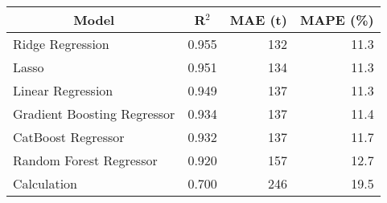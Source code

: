 
\begin{tabular}[t]{lrrr}
\toprule
\multicolumn{1}{c}{Model} & \multicolumn{1}{c}{R$^2$} & \multicolumn{1}{c}{MAE (t)} & \multicolumn{1}{c}{MAPE (\%)}\\
\midrule
Ridge Regression & 0.955 & 132 & 11.3\\
Lasso & 0.951 & 134 & 11.3\\
Linear Regression & 0.949 & 137 & 11.3\\
Gradient Boosting Regressor & 0.934 & 137 & 11.4\\
CatBoost Regressor & 0.932 & 137 & 11.7\\
Random Forest Regressor & 0.920 & 157 & 12.7\\
Calculation & 0.700 & 246 & 19.5\\
\bottomrule
\end{tabular}

